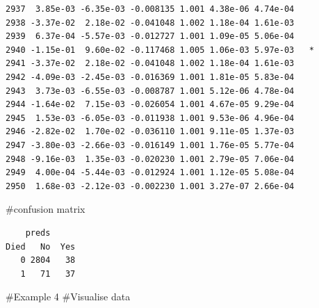 \documentclass[
  letterpaper,
  DIV=11,
  numbers=noendperiod]{scrartcl}
\newenvironment{Shaded}{\begin{snugshade}}{\end{snugshade}}
\newcommand{\AttributeTok}[1]{\textcolor[rgb]{0.40,0.45,0.13}{#1}}
\newcommand{\CommentTok}[1]{\textcolor[rgb]{0.37,0.37,0.37}{#1}}
\newcommand{\FloatTok}[1]{\textcolor[rgb]{0.68,0.00,0.00}{#1}}
\newcommand{\FunctionTok}[1]{\textcolor[rgb]{0.28,0.35,0.67}{#1}}
\newcommand{\NormalTok}[1]{\textcolor[rgb]{0.00,0.23,0.31}{#1}}
\newcommand{\OtherTok}[1]{\textcolor[rgb]{0.00,0.23,0.31}{#1}}
\newcommand{\SpecialCharTok}[1]{\textcolor[rgb]{0.37,0.37,0.37}{#1}}
\newcommand{\StringTok}[1]{\textcolor[rgb]{0.13,0.47,0.30}{#1}}
\begin{document}
\begin{verbatim}
2937  3.85e-03 -6.35e-03 -0.008135 1.001 4.38e-06 4.74e-04    
2938 -3.37e-02  2.18e-02 -0.041048 1.002 1.18e-04 1.61e-03    
2939  6.37e-04 -5.57e-03 -0.012727 1.001 1.09e-05 5.06e-04    
2940 -1.15e-01  9.60e-02 -0.117468 1.005 1.06e-03 5.97e-03   *
2941 -3.37e-02  2.18e-02 -0.041048 1.002 1.18e-04 1.61e-03    
2942 -4.09e-03 -2.45e-03 -0.016369 1.001 1.81e-05 5.83e-04    
2943  3.73e-03 -6.55e-03 -0.008787 1.001 5.12e-06 4.78e-04    
2944 -1.64e-02  7.15e-03 -0.026054 1.001 4.67e-05 9.29e-04    
2945  1.53e-03 -6.05e-03 -0.011938 1.001 9.53e-06 4.96e-04    
2946 -2.82e-02  1.70e-02 -0.036110 1.001 9.11e-05 1.37e-03    
2947 -3.80e-03 -2.66e-03 -0.016149 1.001 1.76e-05 5.77e-04    
2948 -9.16e-03  1.35e-03 -0.020230 1.001 2.79e-05 7.06e-04    
2949  4.00e-04 -5.44e-03 -0.012924 1.001 1.12e-05 5.08e-04    
2950  1.68e-03 -2.12e-03 -0.002230 1.001 3.27e-07 2.66e-04    
\end{verbatim}

\#confusion matrix

\begin{Shaded}
\end{Shaded}

\begin{verbatim}
    preds
Died   No  Yes
   0 2804   38
   1   71   37
\end{verbatim}

\#Example 4 \#Visualise data

\begin{Shaded}
\end{Shaded}
\end{document}
